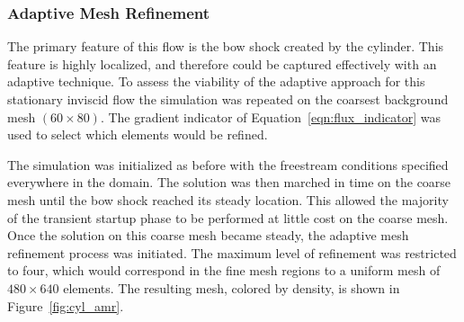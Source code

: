 \subsubsection{Adaptive Mesh Refinement\label{sec:comp_ns_cylinder_AMR}}
The primary feature of this flow is the bow shock created by the cylinder.  This feature is highly localized, and therefore could be captured effectively with an adaptive technique.  To assess the viability of the adaptive approach for this stationary inviscid flow the simulation was repeated on the coarsest background mesh $(60\times80)$.  The gradient indicator of Equation~\eqref{eqn:flux_indicator} was used to select which elements would be refined.  

The simulation was initialized as before with the freestream conditions specified everywhere in the domain.  The solution was then marched in time on the coarse mesh until the bow shock reached its  steady location.  This allowed the majority of the transient startup phase to be performed at little cost on the coarse mesh.  Once the solution on this coarse mesh became steady, the adaptive mesh refinement process was initiated.  The maximum level of refinement was restricted to four, which would correspond in the fine mesh regions to a uniform mesh of $480 \times 640$ elements.  The resulting mesh, colored by density, is shown in Figure~\ref{fig:cyl_amr}.
